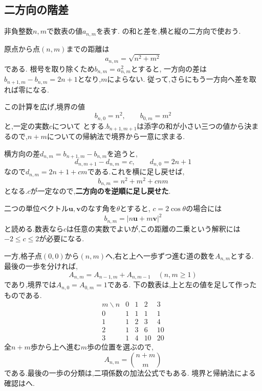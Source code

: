 \subsection{二方向の階差}\label{節：二重数列と二方向の階差}
  非負整数$n,m$で数表の値$a_{n,m}$を表す.
  の和と差を,横と縦の二方向で使おう.

  原点から点$(n,m)$までの距離は
  \[ a_{n,m}=\sqrt{n^2+m^2} \]
  である.
  根号を取り除くため$b_{n,m}=a_{n,m}^2$とすると,
  一方向の差は$b_{n+1,m}-b_{n,m}=2n+1$となり,$m$によらない.
  従って,さらにもう一方向へ差を取れば零になる.

  この計算を広げ,境界の値
  \[
    b_{n,0}=n^2,\qquad b_{0,m}=m^2
  \]
  と,一定の実数$c$について
  \BookMathLayout{\[
    b_{n+1,m+1}-b_{n+1,m}-b_{n,m+1}+b_{n,m}=c
  \]}{\[
    \begin{aligned}
      b_{n+1,m+1}-b_{n+1,m}\\
      {}-b_{n,m+1}+b_{n,m}=c
    \end{aligned}
  \]}
  とする.$b_{n+1,m+1}$は添字の和が小さい三つの値から決まるので,$n+m$についての帰納法で境界から一意に求まる.

  横方向の差$d_{n,m}=b_{n+1,m}-b_{n,m}$を追うと,
  \[
    d_{n,m+1}-d_{n,m}=c,\qquad d_{n,0}=2n+1
  \]
  なので$d_{n,m}=2n+1+cm$である.これを横に足し戻せば,
  \[
    b_{n,m}=n^2+m^2+cnm
  \]
  となる.$c$が一定なので,\textbf{二方向のを逆順に足し戻せた}.

  二つの単位ベクトル$\boldsymbol u,\boldsymbol v$のなす角を$\theta$とすると,
  $c=2\cos\theta$の場合には
  \[
    b_{n,m}=|n\boldsymbol u+m\boldsymbol v|^2
  \]
  と読める.数表なら$c$は任意の実数でよいが,この距離の二乗という解釈には$-2\le c\le2$が必要になる.

  一方,格子点$(0,0)$から$(n,m)$へ,右と上へ一歩ずつ進む道の数を$A_{n,m}$とする.
  最後の一歩を分ければ,
  \[
    A_{n,m}=A_{n-1,m}+A_{n,m-1}\quad(n,m\ge1)
  \]
  であり,境界では$A_{n,0}=A_{0,m}=1$である.
  \BookFigLatticeRecurrence
  下の数表は,上と左の値を足して作ったものである.
  \[
    \begin{array}{c|rrrr}
      m\backslash n&0&1&2&3\\\hline
      0&1&1&1&1\\
      1&1&2&3&4\\
      2&1&3&6&10\\
      3&1&4&10&20
    \end{array}
  \]
  全$n+m$歩から上へ進む$m$歩の位置を選ぶので,
  \[
    A_{n,m}=\binom{n+m}{m}
  \]
  である.最後の一歩の分類は,二項係数の加法公式でもある.
  境界と帰納法による確認はへ.

